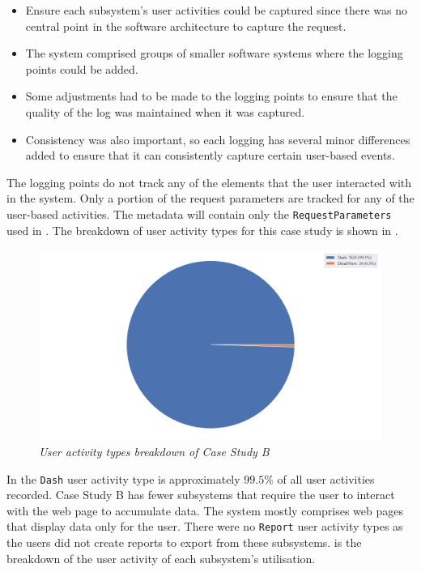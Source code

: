 \begin{itemize}
	\item Ensure each subsystem's user activities could be captured since there was no central point in the software architecture to capture the request. 
	\item The system comprised groups of smaller software systems where the logging points could be added.
	\item Some adjustments had to be made to the logging points to ensure that the quality of the log was maintained when it was captured. 
	\item Consistency was also important, so each logging has several minor differences added to ensure that it can consistently capture certain user-based events.
\end{itemize}

The logging points do not track any of the elements that the user interacted with in the system. Only a portion of the request parameters are tracked for any of the user-based activities. The metadata will contain only the \texttt{RequestParameters} used in . The breakdown of user activity types for this case study is shown in .

\begin{figure}[!htb]
	\centering %
	\includegraphics[width=0.95\linewidth]{img/ch3/analysis/case_B_breakdown.pdf}
	\caption[User activity types breakdown of Case Study B]
	{\textit{User activity types breakdown of Case Study B}}\label{fig:ch3_caseBBreakdown}
\end{figure}

In  the \texttt{Dash} user activity type is approximately $99.5\%$ of all user activities recorded. Case Study B has fewer subsystems that require the user to interact with the web page to accumulate data. The system mostly comprises web pages that display data only for the user. There were no \texttt{Report} user activity types as the users did not create reports to export from these subsystems.  is the breakdown of the user activity of each subsystem's utilisation.

